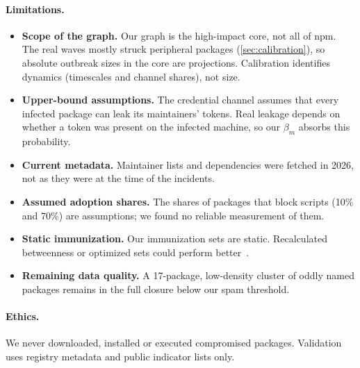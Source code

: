 \paragraph{Limitations.}
\begin{itemize}
  \item \textbf{Scope of the graph.} Our graph is the high-impact core, not all of npm. The real waves
        mostly struck peripheral packages (\cref{sec:calibration}), so absolute outbreak sizes in the
        core are projections. Calibration identifies dynamics (timescales and channel shares), not size.
  \item \textbf{Upper-bound assumptions.} The credential channel assumes that every infected package
        can leak its maintainers' tokens. Real leakage depends on whether a token was present on the
        infected machine, so our $\beta_m$ absorbs this probability.
  \item \textbf{Current metadata.} Maintainer lists and dependencies were fetched in 2026, not as they
        were at the time of the incidents.
  \item \textbf{Assumed adoption shares.} The shares of packages that block scripts (10\% and 70\%) are
        assumptions; we found no reliable measurement of them.
  \item \textbf{Static immunization.} Our immunization sets are static. Recalculated betweenness or
        optimized sets could perform better~\citep{holme2002attack,schneider2011limited}.
  \item \textbf{Remaining data quality.} A 17-package, low-density cluster of oddly named packages
        remains in the full closure below our spam threshold.
\end{itemize}

\paragraph{Ethics.}
We never downloaded, installed or executed compromised packages. Validation uses registry metadata and
public indicator lists only.
